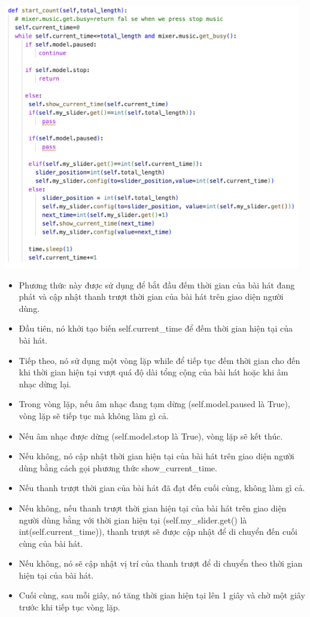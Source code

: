 \documentclass[a4paper]{article}
\begin{document}
\begin{center}
\includegraphics[width=130mm]{template_SGU 2/audio_start_count.png}
\end{center}
\begin{itemize}
    \item Phương thức này được sử dụng để bắt đầu đếm thời gian của bài hát đang phát và cập nhật thanh trượt thời gian của bài hát trên giao diện người dùng.
    \item Đầu tiên, nó khởi tạo biến self.current\_time để đếm thời gian hiện tại của bài hát.
    \item Tiếp theo, nó sử dụng một vòng lặp while để tiếp tục đếm thời gian cho đến khi thời gian hiện tại vượt quá độ dài tổng cộng của bài hát hoặc khi âm nhạc dừng lại.
    \item Trong vòng lặp, nếu âm nhạc đang tạm dừng (self.model.paused là True), vòng lặp sẽ tiếp tục mà không làm gì cả.
    \item Nếu âm nhạc được dừng (self.model.stop là True), vòng lặp sẽ kết thúc.
    \item Nếu không, nó cập nhật thời gian hiện tại của bài hát trên giao diện người dùng bằng cách gọi phương thức show\_current\_time.
    \item Nếu thanh trượt thời gian của bài hát đã đạt đến cuối cùng, không làm gì cả.
    \item Nếu không, nếu thanh trượt thời gian hiện tại của bài hát trên giao diện người dùng bằng với thời gian hiện tại (self.my\_slider.get() là int(self.current\_time)), thanh trượt sẽ được cập nhật để di chuyển đến cuối cùng của bài hát.
    \item Nếu không, nó sẽ cập nhật vị trí của thanh trượt để di chuyển theo thời gian hiện tại của bài hát.
    \item Cuối cùng, sau mỗi giây, nó tăng thời gian hiện tại lên 1 giây và chờ một giây trước khi tiếp tục vòng lặp.
\end{itemize}
\end{document}
